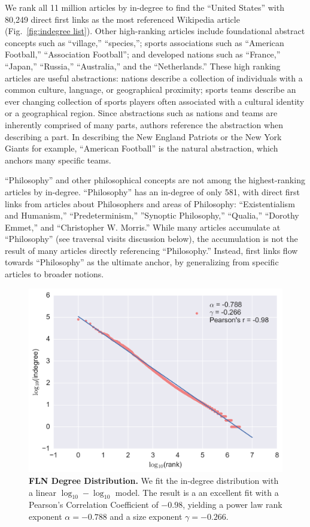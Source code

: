 \documentclass[11pt]{report}
\begin{document}
We rank all 11 million articles by in-degree to find 
the ``United States'' with 80,249 direct first links as the most referenced
Wikipedia article 
(Fig.~\ref{fig:indegree list}). 
Other high-ranking articles
include foundational abstract concepts such as ``village,'' ``species,''; 
sports associations such as ``American Football,'' ``Association Football''; 
and developed nations such as ``France,'' ``Japan,'' ``Russia,'' ``Australia,'' and 
the ``Netherlands.'' These high ranking articles are useful abstractions: nations
describe a collection of individuals with a common culture, language, or 
geographical proximity; sports teams describe an ever changing collection of 
sports players often associated with a cultural identity or a geographical 
region. 
Since abstractions such as nations and teams are inherently comprised
of many parts, authors reference the abstraction when describing a part.
In describing the New England Patriots or the New York Giants
for example, ``American Football'' is the natural abstraction, which 
anchors many specific teams.

``Philosophy'' and other philosophical concepts
are not among the highest-ranking articles by in-degree.
``Philosophy'' has an in-degree of only 581, with direct first links from articles about Philosophers and areas of Philosophy: ``Existentialism and Humanism,'' ``Predeterminism,'' ''Synoptic Philosophy,'' ``Qualia,'' ``Dorothy Emmet,'' and ``Christopher W. Morris.''
While many articles accumulate at ``Philosophy'' (see traversal visits discussion below), 
the accumulation is not the 
result of many articles directly referencing ``Philosophy.'' 
Instead, first links flow towards ``Philosophy'' as the 
ultimate anchor, by generalizing from specific articles to broader notions.

\begin{figure}[tp!]
  \includegraphics[width=\columnwidth]{graphics/ndegree_loglog.png}
  \caption{
    \textbf{FLN Degree Distribution.}
We fit the in-degree distribution with a linear $\log_{10}-\log_{10}$ model. 
The result is a 
an excellent fit with a Pearson's Correlation Coefficient of $-0.98$, yielding a 
power law rank exponent $\alpha = -0.788$ and a size exponent $\gamma = -0.266$. 
}
  \label{fig:degree distribution}
\end{figure}
\end{document}
